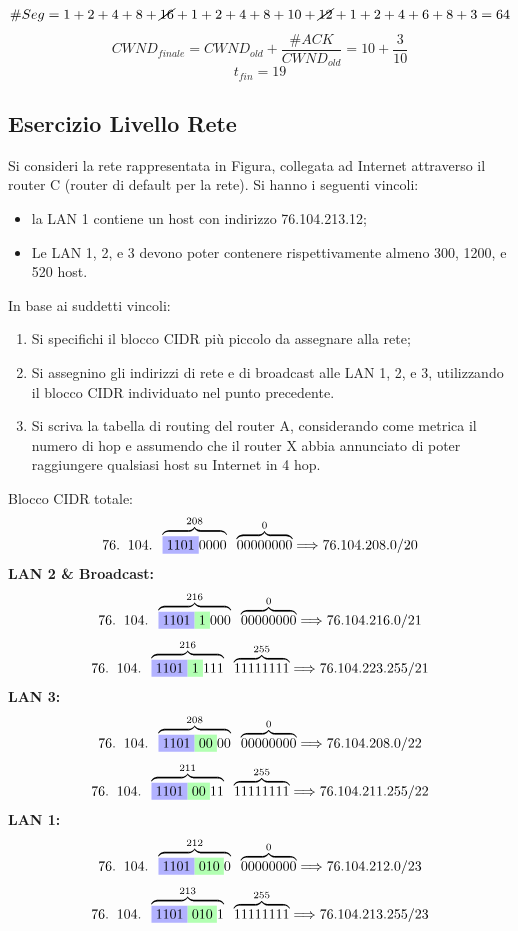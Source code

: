 \documentclass[a4paper]{article}
\begin{document}
    \[\# Seg = 1 + 2 + 4 + 8 + \cancel{16} + 1 + 2 + 4 + 8 + 10 + \cancel{12} + 1 + 2+ 4 + 6 + 8 + 3 = 64\]
    \[CWND_{finale} = CWND_{old} + \frac{\#ACK}{CWND_{old}} = 10 + \frac{3}{10}\]
    \[t_{fin} = 19\]
\subsection*{Esercizio Livello Rete}

Si consideri la rete rappresentata in Figura, collegata ad
Internet attraverso il router C (router di default per la
rete). Si hanno i seguenti vincoli:
\begin{itemize}
    \item la LAN 1 contiene un host con indirizzo
    76.104.213.12;
    \item Le LAN 1, 2, e 3 devono poter contenere
    rispettivamente almeno 300, 1200, e 520 host.
\end{itemize}
In base ai suddetti vincoli:
\begin{enumerate}
    \item Si specifichi il blocco CIDR più piccolo da assegnare alla rete;
    \item Si assegnino gli indirizzi di rete e di broadcast alle LAN 1, 2, e 3, utilizzando il blocco CIDR individuato
    nel punto precedente.
    \item Si scriva la tabella di routing del router A, considerando come metrica il numero di hop e assumendo
    che il router X abbia annunciato di poter raggiungere qualsiasi host su Internet in 4 hop.    
\end{enumerate}
\noindent
Blocco CIDR totale:
\[76. \; \; 104. \; \; \overbrace{\colorbox{blue!30!white}{1101}0000}^{208} \; \; \overbrace{00000000}^{0} \Longrightarrow 76.104.208.0/20\]
\textbf{LAN 2 \& Broadcast:} 
\[76. \; \; 104. \; \; \overbrace{\colorbox{blue!30!white}{1101}\colorbox{green!30!white}{1}000}^{216} \; \; \overbrace{00000000}^{0} \Longrightarrow 76.104.216.0/21\]
\[76. \; \; 104. \; \; \overbrace{\colorbox{blue!30!white}{1101}\colorbox{green!30!white}{1}111}^{216} \; \; \overbrace{11111111}^{255} \Longrightarrow 76.104.223.255/21\]
\textbf{LAN 3:}
\[76. \; \; 104. \; \; \overbrace{\colorbox{blue!30!white}{1101}\colorbox{green!30!white}{00}00}^{208} \; \; \overbrace{00000000}^{0} \Longrightarrow 76.104.208.0/22\]
\[76. \; \; 104. \; \; \overbrace{\colorbox{blue!30!white}{1101}\colorbox{green!30!white}{00}11}^{211} \; \; \overbrace{11111111}^{255} \Longrightarrow 76.104.211.255/22\]
\textbf{LAN 1:}
\[76. \; \; 104. \; \; \overbrace{\colorbox{blue!30!white}{1101}\colorbox{green!30!white}{010}0}^{212} \; \; \overbrace{00000000}^{0} \Longrightarrow 76.104.212.0/23\]
\[76. \; \; 104. \; \; \overbrace{\colorbox{blue!30!white}{1101}\colorbox{green!30!white}{010}1}^{213} \; \; \overbrace{11111111}^{255} \Longrightarrow 76.104.213.255/23\]
\end{document}
